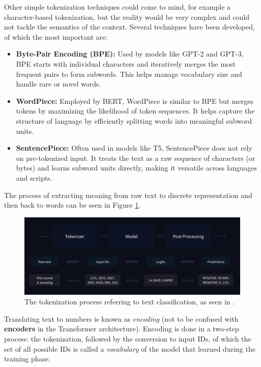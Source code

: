 Other simple tokenization techniques could come to mind, for example a character-based tokenization, but the reality would be very complex and could not tackle the semantics of the context. Several techniques have been developed, of which the most important are: \cite{rajaraman2024theorytokenizationllms}

\begin{itemize}
    \item \textbf{Byte-Pair Encoding (BPE):} Used by models like GPT-2 and GPT-3, BPE starts with individual characters and iteratively merges the most frequent pairs to form subwords. This helps manage vocabulary size and handle rare or novel words. \cite{sennrich2016neural}
    \item \textbf{WordPiece:} Employed by BERT, WordPiece is similar to BPE but merges tokens by maximizing the likelihood of token sequences. It helps capture the structure of language by efficiently splitting words into meaningful subword units.
    \item \textbf{SentencePiece:} Often used in models like T5, SentencePiece does not rely on pre-tokenized input. It treats the text as a raw sequence of characters (or bytes) and learns subword units directly, making it versatile across languages and scripts.
\end{itemize}

The process of extracting meaning from raw text to discrete representation and then back to words can be seen in Figure \ref{fig:tokenization}.

\begin{figure}[b]
    \centering
    \includegraphics[width=1\textwidth]{images/tokenizer-process.png}
    \caption{The tokenization process referring to text classification, as seen in \cite{huggingfacecourse}.}
    \label{fig:tokenization}
\end{figure}

Translating text to numbers is known as \textit{encoding} (not to be confused with \textbf{encoders} in the Transformer architecture). Encoding is done in a two-step process: the tokenization, followed by the conversion to input IDs, of which the set of all possible IDs is called a \textit{vocabulary} of the model that learned during the training phase.

